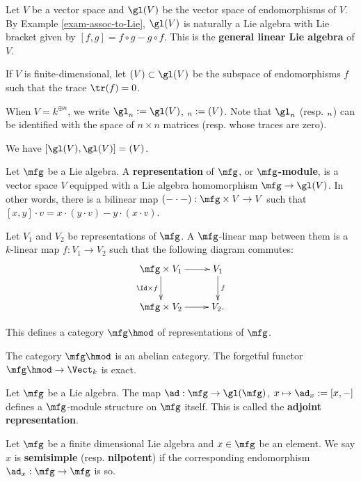 \begin{exam}
	Let $V$ be a vector space and $\gl(V)$ be the vector space of endomorphisms of $V$. By Example \ref{exam-assoc-to-Lie}, $\gl(V)$ is naturally a Lie algebra with Lie bracket given by $[f,g]=f\circ g-g\circ f$. This is the \textbf{general linear Lie algebra} of $V$. 

	If $V$ is finite-dimensional, let $\sl(V)\subset \gl(V)$ be the subspace of endomorphisms $f$ such that the trace $\tr(f)=0$.

	When $V=k^{\oplus n}$, we write $\gl_n:= \gl(V)$, $\sl_n:=\sl(V)$. Note that $\gl_n$ (resp. $\sl_n$) can be identified with the space of $n\times n$ matrices (resp. whose traces are zero).
\end{exam}

\begin{facts}
	We have $[\gl(V),\gl(V)] = \sl(V)$.
\end{facts}

\begin{defn}
	Let $\mfg$ be a Lie algebra. A \textbf{representation} of $\mfg$, or \textbf{$\mfg$-module}, is a vector space $V$ equipped with a Lie algebra homomorphism $\mfg \to \gl(V)$. In other words, there is a bilinear map $(-\cdot-):\mfg \times V \to V$ such that $[x,y]\cdot v = x\cdot (y\cdot v) - y\cdot(x\cdot v)$.

	Let $V_1$ and $V_2$ be representations of $\mfg$. A $\mfg$-linear map between them is a $k$-linear map $f:V_1\to V_2$ such that the following diagram commutes:
	\[
		\xymatrix{
			\mfg \times V_1 
				\ar[r] \ar[d]_-{\Id\times f}
			& V_1 
				\ar[d]^-f \\
			\mfg \times V_2
				\ar[r] 
			& V_2.
		}
	\]

	This defines a category $\mfg\hmod$ of representations of $\mfg$.
\end{defn}

\begin{facts}
	The category $\mfg\hmod$ is an abelian category. The forgetful functor $\mfg\hmod\to \Vect_k$ is exact.
\end{facts}

\begin{exam}
	Let $\mfg$ be a Lie algebra. The map $\ad: \mfg \to \gl(\mfg)$, $x\mapsto \ad_x:=[x,-]$ defines a $\mfg$-module structure on $\mfg$ itself. This is called the \textbf{adjoint representation}. 
\end{exam}

\begin{defn}
	Let $\mfg$ be a finite dimensional Lie algebra and $x\in \mfg$ be an element. We say $x$ is \textbf{semisimple} (resp. \textbf{nilpotent}) if the corresponding endomorphism $\ad_x: \mfg \to \mfg$ is so.
\end{defn}



